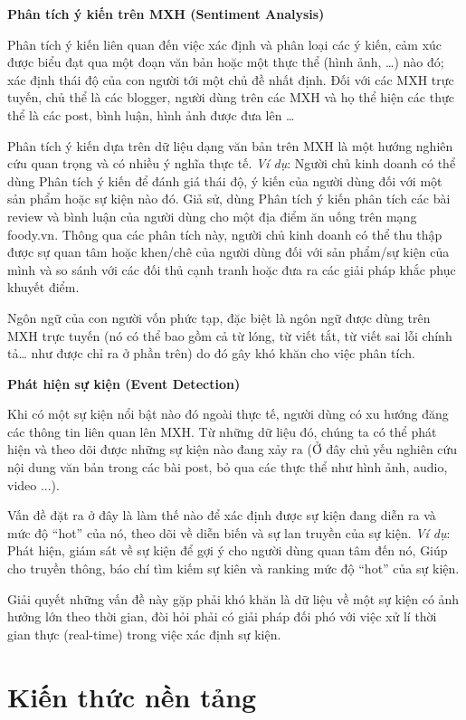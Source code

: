 \documentclass[12pt]{extarticle}
\begin{document}
			\par \textbf{Phân tích ý kiến trên MXH (Sentiment Analysis)}
			\par Phân tích ý kiến liên quan đến việc xác định và phân loại các ý kiến, cảm xúc được biểu đạt qua một đoạn văn bản hoặc một thực thể (hình ảnh, …) nào đó; xác định thái độ của con người tới một chủ đề nhất định. Đối với các MXH trực tuyến, chủ thể là các blogger, người dùng trên các MXH và họ thể hiện các thực thể là các post, bình luận, hình ảnh được đưa lên …
			\par Phân tích ý kiến dựa trên dữ liệu dạng văn bản trên MXH là một hướng nghiên cứu quan trọng và có nhiều ý nghĩa thực tế. \textit{Ví dụ}: Người chủ kinh doanh có thể dùng Phân tích ý kiến để đánh giá thái độ, ý kiến của người dùng đối với một sản phẩm hoặc sự kiện nào đó. Giả sử, dùng Phân tích ý kiến phân tích các bài review và bình luận của người dùng cho một địa điểm ăn uống trên mạng foody.vn. Thông qua các phân tích này, người chủ kinh doanh có thể thu thập được sự quan tâm hoặc khen/chê của người dùng đối với sản phẩm/sự kiện của mình và so sánh với các đối thủ cạnh tranh hoặc đưa ra các giải pháp khắc phục khuyết điểm.
			\par Ngôn ngữ của con người vốn phức tạp, đặc biệt là ngôn ngữ được dùng trên MXH trực tuyến (nó có thể bao gồm cả từ lóng, từ viết tắt, từ viết sai lỗi chính tả… như được chỉ ra ở phần trên) do đó gây khó khăn cho việc phân tích.
			\par \textbf{Phát hiện sự kiện (Event Detection)}
			\par Khi có một sự kiện nổi bật nào đó ngoài thực tế, người dùng có xu hướng đăng các thông tin liên quan lên MXH. Từ những dữ liệu đó, chúng ta có thể phát hiện và theo dõi được những sự kiện nào đang xảy ra (Ở đây chủ yếu nghiên cứu nội dung văn bản trong các bài post, bỏ qua các thực thể như hình ảnh, audio, video ...).
			\par Vấn đề đặt ra ở đây là làm thế nào để xác định được sự kiện đang diễn ra và mức độ “hot” của nó, theo dõi về diễn biến và sự lan truyền của sự kiện. \textit{Ví dụ}: Phát hiện, giám sát về sự kiện để gợi ý cho người dùng quan tâm đến nó, Giúp cho truyền thông, báo chí tìm kiếm sự kiên và ranking mức độ “hot” của sự kiện.
			\par Giải quyết những vấn đề này gặp phải khó khăn là dữ liệu về một sự kiện có ảnh hưởng lớn theo thời gian, đòi hỏi phải có giải pháp đối phó với việc xử lí thời gian thực (real-time) trong việc xác định sự kiện.
	\section{Kiến thức nền tảng}
\end{document}
